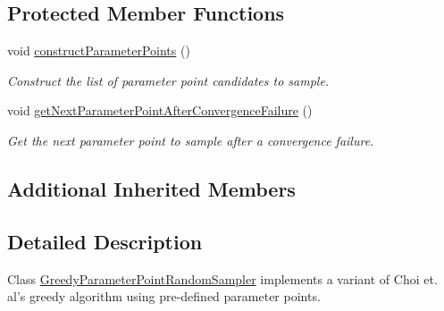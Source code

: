 \subsection*{Protected Member Functions}
\begin{DoxyCompactItemize}
\item 
\hypertarget{class_c_a_r_o_m_1_1_greedy_parameter_point_pre_defined_sampler_a38590cbc42e76266ca787f94c3d6a7cc}{void \hyperlink{class_c_a_r_o_m_1_1_greedy_parameter_point_pre_defined_sampler_a38590cbc42e76266ca787f94c3d6a7cc}{construct\-Parameter\-Points} ()}\label{class_c_a_r_o_m_1_1_greedy_parameter_point_pre_defined_sampler_a38590cbc42e76266ca787f94c3d6a7cc}

\begin{DoxyCompactList}\small\item\em Construct the list of parameter point candidates to sample. \end{DoxyCompactList}\item 
\hypertarget{class_c_a_r_o_m_1_1_greedy_parameter_point_pre_defined_sampler_adaab047450d7ab8892e6c3de08376680}{void \hyperlink{class_c_a_r_o_m_1_1_greedy_parameter_point_pre_defined_sampler_adaab047450d7ab8892e6c3de08376680}{get\-Next\-Parameter\-Point\-After\-Convergence\-Failure} ()}\label{class_c_a_r_o_m_1_1_greedy_parameter_point_pre_defined_sampler_adaab047450d7ab8892e6c3de08376680}

\begin{DoxyCompactList}\small\item\em Get the next parameter point to sample after a convergence failure. \end{DoxyCompactList}\end{DoxyCompactItemize}
\subsection*{Additional Inherited Members}


\subsection{Detailed Description}
Class \hyperlink{class_c_a_r_o_m_1_1_greedy_parameter_point_random_sampler}{Greedy\-Parameter\-Point\-Random\-Sampler} implements a variant of Choi et. al's greedy algorithm using pre-\/defined parameter points. 

